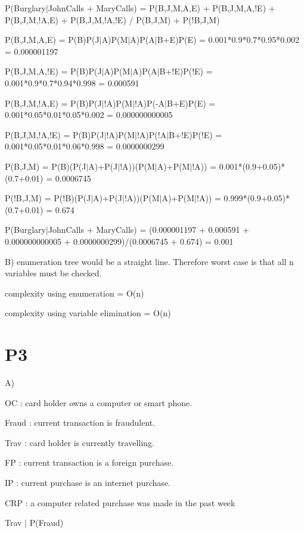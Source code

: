 \documentclass{article}
\begin{document}
        P(Burglary$|$JohnCalls + MaryCalls) = P(B,J,M,A,E) + P(B,J,M,A,!E) + P(B,J,M,!A,E) + P(B,J,M,!A,!E) / P(B,J,M) + P(!B,J,M)

	P(B,J,M,A,E) = P(B)P(J$|$A)P(M$|$A)P(A$|$B+E)P(E) = 0.001*0.9*0.7*0.95*0.002 = 0.000001197
	
	P(B,J,M,A,!E) = P(B)P(J$|$A)P(M$|$A)P(A$|$B+!E)P(!E) = 0.001*0.9*0.7*0.94*0.998 = 0.000591
	
	P(B,J,M,!A,E) = P(B)P(J$|$!A)P(M$|$!A)P(-A$|$B+E)P(E) = 0.001*0.05*0.01*0.05*0.002 = 0.000000000005
	
	P(B,J,M,!A,!E) = P(B)P(J$|$!A)P(M$|$!A)P(!A$|$B+!E)P(!E) = 0.001*0.05*0.01*0.06*0.998 = 0.0000000299
	
	P(B,J,M) = P(B)(P(J$|$A)+P(J$|$!A))(P(M$|$A)+P(M$|$!A)) = 0.001*(0.9+0.05)*(0.7+0.01) = 0.0006745
	
	P(!B,J,M) = P(!B)(P(J$|$A)+P(J$|$!A))(P(M$|$A)+P(M$|$!A)) = 0.999*(0.9+0.05)*(0.7+0.01) = 0.674
	
	P(Burglary$|$JohnCalls + MaryCalls) = (0.000001197 + 0.000591 + 0.000000000005 + 0.0000000299)/(0.0006745 + 0.674) = 0.001
	
\hspace{5mm}
	
B)	
        enumeration tree would be a straight line. Therefore worst case is that all n variables must be checked. 

	complexity using enumeration = O(n)
	
	complexity using variable elimination = O(n)
	
\section*{P3}

\hspace{5mm}

A)

OC : card holder owns a computer or smart phone.

Fraud : current transaction is fraudulent.

Trav : card holder is currently travelling.

FP : current transaction is a foreign purchase.

IP : current purchase is an internet purchase.

CRP : a computer related purchase was made in the past week

\hspace{5mm}

Trav $|$ P(Fraud)
\end{document}
